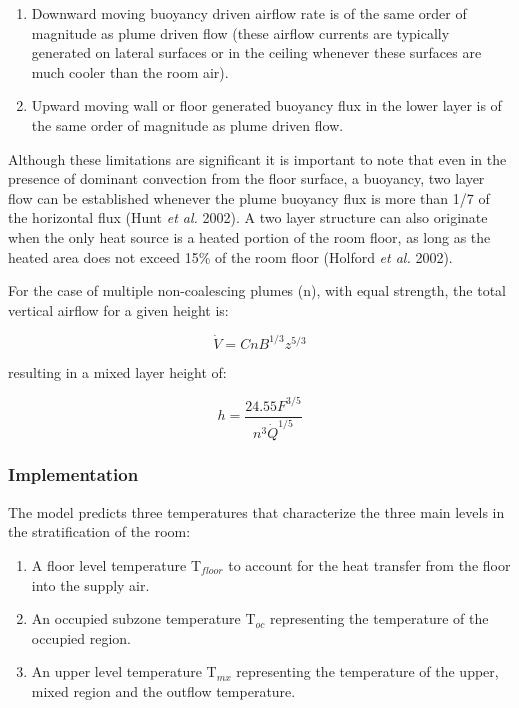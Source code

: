 {\begin{enumerate}
\item Downward moving buoyancy driven airflow rate is of the same order of magnitude as plume driven flow (these airflow currents are typically generated on lateral surfaces or in the ceiling whenever these surfaces are much cooler than the room air).
\item Upward moving wall or floor generated buoyancy flux in the lower layer is of the same order of magnitude as plume driven flow.
\end{enumerate}

Although these limitations are significant it is important to note that even in the presence of dominant convection from the floor surface, a buoyancy, two layer flow can be established whenever the plume buoyancy flux is more than 1/7 of the horizontal flux (Hunt \emph{et al.} 2002). A two layer structure can also originate when the only heat source is a heated portion of the room floor, as long as the heated area does not exceed 15\% of the room floor (Holford \emph{et al.} 2002).

For the case of multiple non-coalescing plumes (n), with equal strength, the total vertical airflow for a given height is:

\begin{equation}
  \dot{V} = CnB^{1/3}z^{5/3}
\end{equation}

resulting in a mixed layer height of:

\begin{equation}
  h = \frac{24.55F^{3/5}}{{n^3 \dot{Q}}^{1/5}}
\end{equation}

\subsubsection{Implementation}\label{implementation}

The model predicts three temperatures that characterize the three main levels in the stratification of the room:

\begin{enumerate}
\item A floor level temperature T\(_{floor}\) to account for the heat transfer from the floor into the supply air.
\item An occupied subzone temperature T\(_{oc}\) representing the temperature of the occupied region.
\item An upper level temperature T\(_{mx}\) representing the temperature of the upper, mixed region and the outflow temperature.
\end{enumerate}

}
